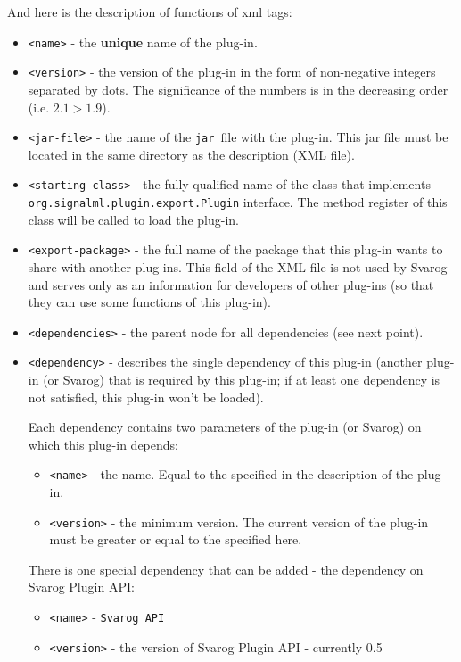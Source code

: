 \documentclass{article}
\begin{document}
And here is the description of functions of xml tags:
\begin{itemize}
  \item \verb=<name>= - the \textbf{unique} name of the plug-in.
  \item \verb=<version>= - the version of the plug-in in the form of non-negative integers separated by dots.
  	The significance of the numbers is in the decreasing order (i.e. $2.1 > 1.9$).
  \item \verb=<jar-file>= - the name of the \verb=jar =file with the plug-in.
  	This jar file must be located in the same directory as the description (XML file).
  \item \verb=<starting-class>= - the fully-qualified name of the class that implements \verb=org.signalml.plugin.export.Plugin=
  	interface. The method register of this class will be called to load the plug-in.
  \item \verb=<export-package>= - the full name of the package that this plug-in wants to share with another plug-ins.
  	This field of the XML file is not used by Svarog and serves only as an information for developers of other
  	plug-ins (so that they can use some functions of this plug-in).
  \item \verb=<dependencies>= - the parent node for all dependencies (see next point).
  \item \verb=<dependency>= - describes the single dependency of this plug-in (another plug-in (or Svarog) that is required by this plug-in;
  	if at least one dependency is not satisfied, this plug-in won't be loaded).
  	
  	Each dependency contains two parameters of the plug-in (or Svarog) on which this plug-in depends:
  	\begin{itemize}
			\item \verb=<name>= - the name. Equal to the specified in the description of the plug-in.
			\item \verb=<version>= - the minimum version. The current version of the plug-in must be greater or equal to the specified here.
		\end{itemize}
		There is one special dependency that can be added - the dependency on Svarog Plugin API:
		\begin{itemize}
			\item \verb=<name>= - \verb=Svarog API=
			\item \verb=<version>= - the version of Svarog Plugin API - currently 0.5
		\end{itemize}
\end{itemize}
\end{document}
